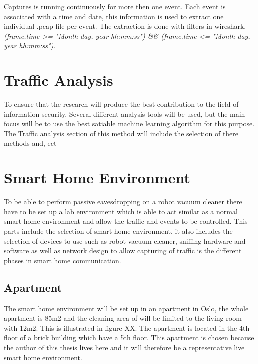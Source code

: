Captures is running continuously for more then one event. Each event is associated with a time and date, this information is used to extract one individual .pcap file per event. The extraction is done with filters in wireshark. 
\textit{(frame.time >= "Month day, year hh:mm:ss") \&\& (frame.time <= "Month day, year hh:mm:ss")}.



\section{Traffic Analysis}
To ensure that the research will produce the best contribution to the field of information security. Several different analysis tools will be used, but the main focus will be to use the best satiable machine learning algorithm for this purpose. The Traffic analysis section of this method will include the selection of there methods and, ect    

\section{Smart Home Environment}
To be able to perform passive eavesdropping on a robot vacuum cleaner there have to be set up a lab environment which is able to act similar as a normal smart home environment and allow the traffic and events to be controlled. This parts include the selection of smart home environment, it also includes the selection of devices to use such as robot vacuum cleaner, sniffing hardware and software as well as network design to allow capturing of traffic is the different phases in smart home communication. 

\subsection{Apartment}
The smart home environment will be set up in an apartment in Oslo, the whole apartment is 85m2 and the cleaning area of will be limited to the living room with 12m2. This is illustrated in figure XX. The apartment is located in the 4th floor of a brick building which have a 5th floor. This apartment is chosen because the author of this thesis lives here and it will therefore be a representative live smart home environment.


